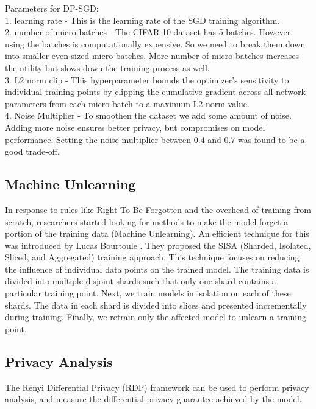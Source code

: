 \documentclass[11pt,letterpaper]{article}
\begin{document}
Parameters for DP-SGD:\\
1. learning rate - This is the learning rate of the SGD training algorithm.\\
2. number of micro-batches - The CIFAR-10 dataset has 5 batches. However, using the batches is computationally expensive. So we need to break them down into smaller even-sized micro-batches. More number of micro-batches increases the utility but slows down the training process as well.\\
3. L2 norm clip - This hyperparameter bounds the optimizer's sensitivity to individual training points by clipping the cumulative gradient across all network parameters from each micro-batch to a maximum L2 norm value.\\
4. Noise Multiplier - To smoothen the dataset we add some amount of noise. Adding more noise ensures better privacy, but compromises on model performance. Setting the noise multiplier between 0.4 and 0.7 was found to be a good trade-off.

\subsection{Machine Unlearning}
In response to rules like Right To Be Forgotten and the overhead of training from scratch, researchers started looking for methods to make the model forget a portion of the training data (Machine Unlearning).
An efficient technique for this was introduced by Lucas Bourtoule \cite{bourtoule2021machine}. They proposed the SISA (Sharded, Isolated, Sliced, and Aggregated) training approach. This technique focuses on reducing the influence of individual data points on the trained model. The training data is divided into multiple disjoint shards such that only one shard contains a particular training point. Next, we train models in isolation on each of these shards. The data in each shard is divided into slices and presented incrementally during training. Finally, we retrain only the affected model to unlearn a training point. \par

\subsection{Privacy Analysis}
The Rényi Differential Privacy (RDP) \cite{mironov2017renyi} framework can be used to perform privacy analysis, and measure the differential-privacy guarantee achieved by the model.\\
\end{document}
